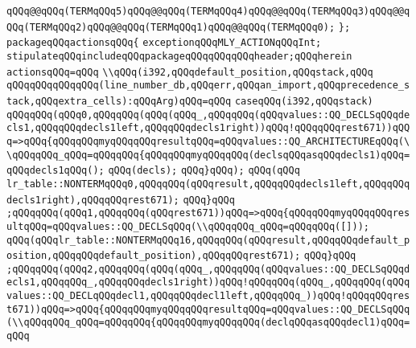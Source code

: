 \verb|qQQq@@qQQq(TERMqQQq5)qQQq@@qQQq(TERMqQQq4)qQQq@@qQQq(TERMqQQq3)qQQq@@qQQq(TERMqQQq2)qQQq@@qQQq(TERMqQQq1)qQQq@@qQQq(TERMqQQq0);|\newline
\verb|};|\newline
\verb|packageqQQqactionsqQQq{|\newline
\verb|exceptionqQQqMLY_ACTIONqQQqInt;|\newline
\verb|stipulateqQQqincludeqQQqpackageqQQqqQQqqQQqheader;qQQqherein|\newline
\verb|actionsqQQq=qQQq|\newline
\verb|\\qQQq(i392,qQQqdefault_position,qQQqstack,qQQq|\newline
\verb|qQQqqQQqqQQqqQQq(line_number_db,qQQqerr,qQQqan_import,qQQqprecedence_stack,qQQqextra_cells):qQQqArg)qQQq=qQQq|\newline
\verb|caseqQQq(i392,qQQqstack)|\newline
\verb|qQQqqQQq(qQQq0,qQQqqQQq(qQQq(qQQq_,qQQqqQQq(qQQqvalues::QQ_DECLSqQQqdecls1,qQQqqQQqdecls1left,qQQqqQQqdecls1right))qQQq!qQQqqQQqrest671))qQQq=>qQQq{qQQqqQQqmyqQQqqQQqresultqQQq=qQQqvalues::QQ_ARCHITECTUREqQQq(\\qQQqqQQq_qQQq=qQQqqQQq{qQQqqQQqmyqQQqqQQq(declsqQQqasqQQqdecls1)qQQq=qQQqdecls1qQQq();|\newline
\verb|qQQq(decls);|\newline
\verb|qQQq}qQQq);|\newline
\verb|qQQq(qQQq|\newline
\verb|lr_table::NONTERMqQQq0,qQQqqQQq(qQQqresult,qQQqqQQqdecls1left,qQQqqQQqdecls1right),qQQqqQQqrest671);|\newline
\verb|qQQq}qQQq|\newline
\verb|;qQQqqQQq(qQQq1,qQQqqQQq(qQQqrest671))qQQq=>qQQq{qQQqqQQqmyqQQqqQQqresultqQQq=qQQqvalues::QQ_DECLSqQQq(\\qQQqqQQq_qQQq=qQQqqQQq([]));|\newline
\verb|qQQq(qQQqlr_table::NONTERMqQQq16,qQQqqQQq(qQQqresult,qQQqqQQqdefault_position,qQQqqQQqdefault_position),qQQqqQQqrest671);|\newline
\verb|qQQq}qQQq|\newline
\verb|;qQQqqQQq(qQQq2,qQQqqQQq(qQQq(qQQq_,qQQqqQQq(qQQqvalues::QQ_DECLSqQQqdecls1,qQQqqQQq_,qQQqqQQqdecls1right))qQQq!qQQqqQQq(qQQq_,qQQqqQQq(qQQqvalues::QQ_DECLqQQqdecl1,qQQqqQQqdecl1left,qQQqqQQq_))qQQq!qQQqqQQqrest671))qQQq=>qQQq{qQQqqQQqmyqQQqqQQqresultqQQq=qQQqvalues::QQ_DECLSqQQq(\\qQQqqQQq_qQQq=qQQqqQQq{qQQqqQQqmyqQQqqQQq(declqQQqasqQQqdecl1)qQQq=qQQq|\newline
